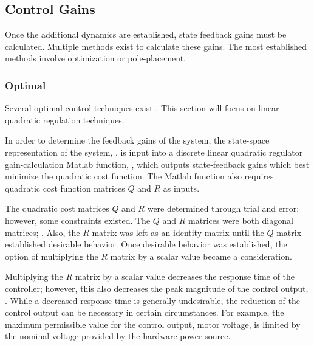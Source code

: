 \documentclass[crop=false,float=true,class=scrreprt]{standalone}
\begin{document}
\subsection{Control Gains}
\label{SEC:controllerDesign:additionalDynamics}

Once the additional dynamics are established,
state feedback gains must be calculated.
Multiple methods exist to calculate these gains.
The most established methods involve optimization or pole-placement.


\subsubsection{Optimal}
\label{SEC:controllerDesign:additionalDynamics:optimal}

Several optimal control techniques exist
\cite{REF:textbook:1995-lewis}.
This section will focus on linear quadratic regulation techniques.


In order to determine the feedback gains of the system,
the state-space representation of the system,
{},
is input into a 
discrete linear quadratic regulator gain-calculation Matlab function, ,
which outputs state-feedback gains which best minimize the quadratic cost function.
The Matlab function also requires quadratic cost function matrices $Q$ and $R$ as inputs.

The quadratic cost matrices $Q$ and $R$ were determined through trial and error;
however, some constraints existed.
The $Q$ and $R$ matrices were both diagonal matrices;
{}.
Also, the $R$ matrix was left as an identity matrix until the $Q$ matrix 
established desirable behavior.
Once desirable behavior was established, 
the option of multiplying the $R$ matrix by a scalar value {} became a consideration.

Multiplying the $R$ matrix by a scalar value decreases the response time of the controller;
however, this also decreases the peak magnitude of the control output,
{}.
While a decreased response time is generally undesirable,
the reduction of the control output can be necessary in certain circumstances.
For example, the maximum permissible value for the control output, motor voltage, 
is limited by the nominal voltage provided by the hardware power source.
\end{document}
